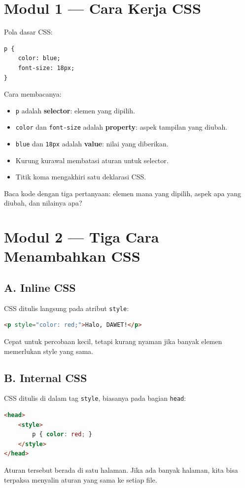 \documentclass[11pt,a4paper]{article}
\begin{document}
\section{Modul 1 --- Cara Kerja CSS}
Pola dasar CSS:
\begin{lstlisting}
p {
    color: blue;
    font-size: 18px;
}
\end{lstlisting}
Cara membacanya:
\begin{itemize}[leftmargin=*]
\item \texttt{p} adalah \textbf{selector}: elemen yang dipilih.
\item \texttt{color} dan \texttt{font-size} adalah \textbf{property}: aspek tampilan yang diubah.
\item \texttt{blue} dan \texttt{18px} adalah \textbf{value}: nilai yang diberikan.
\item Kurung kurawal membatasi aturan untuk selector.
\item Titik koma mengakhiri satu deklarasi CSS.
\end{itemize}
Baca kode dengan tiga pertanyaan: elemen mana yang dipilih, aspek apa yang diubah, dan nilainya apa?

\section{Modul 2 --- Tiga Cara Menambahkan CSS}
\subsection{A. Inline CSS}
CSS ditulis langsung pada atribut \texttt{style}:
\begin{lstlisting}[language=HTML]
<p style="color: red;">Halo, DAWET!</p>
\end{lstlisting}
Cepat untuk percobaan kecil, tetapi kurang nyaman jika banyak elemen memerlukan style yang sama.

\subsection{B. Internal CSS}
CSS ditulis di dalam tag \texttt{style}, biasanya pada bagian \texttt{head}:
\begin{lstlisting}[language=HTML]
<head>
    <style>
        p { color: red; }
    </style>
</head>
\end{lstlisting}
Aturan tersebut berada di satu halaman. Jika ada banyak halaman, kita bisa terpaksa menyalin aturan yang sama ke setiap file.
\end{document}
